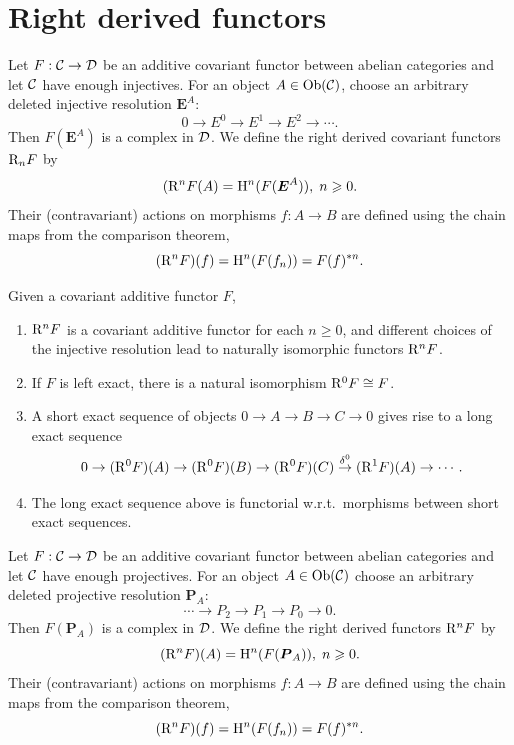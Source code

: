 \section{Right derived functors}

\begin{defn}
    Let $F:\mathcal{C}\to \mathcal{D}$ be an additive covariant functor between abelian categories and let $\mathcal{C}$ have enough injectives. For an object $A\in\operatorname{Ob}(\mathcal{C})$, choose an arbitrary deleted injective resolution $\bm{E}^A$:
    \[0\to E^0\to E^1\to E^2\to\cdots.\]
    Then $F(\bm{E}^A)$ is a complex in $\mathcal{D}$. We define the right derived covariant functors $\mathrm{R}_nF$ by
    \[(\mathrm{R}^nF(A)=\mathrm{H}^n(F(\boldsymbol{E}^A)),\; n\geqslant 0.\]
    Their (contravariant) actions on morphisms $f:A\to B$ are defined using the chain maps from the comparison theorem,
    \[(\mathrm{R}^nF)(f)=\mathrm{H}^n(F(f_n))=F(f)^{\ast n}.\]
\end{defn}

\begin{thm}
    Given a covariant additive functor $F$, 
    \begin{enumerate}
        \item $\mathrm{R}^nF$ is a covariant additive functor for each $n\geq 0$, and different choices of the injective resolution lead to naturally isomorphic functors $\mathrm{R}^nF$.
        \item If $F$ is left exact, there is a natural isomorphism $\mathrm{R}^0F\cong F$.
        \item A short exact sequence of objects $0\to A\to B\to C\to 0$ gives rise to a long exact sequence 
        \[0\to (\mathrm{R}^0F)(A)\to (\mathrm{R}^0F)(B)\to (\mathrm{R}^0F)(C)\overset{\delta^0}{\to} (\mathrm{R}^1F)(A)\to \cdots.\]
        \item The long exact sequence above is functorial w.r.t.\ morphisms between short exact sequences.
    \end{enumerate}
\end{thm}

\begin{defn}
    Let $F:\mathcal{C}\to \mathcal{D}$ be an additive covariant functor between abelian categories and let $\mathcal{C}$ have enough projectives. For an object $A\in \operatorname{Ob}(\mathcal{C})$ choose an arbitrary deleted projective resolution $\bm{P}_A$:
    \[\cdots \to P_2\to P_1\to P_0 \to 0.\]
    Then $F(\bm{P}_A)$ is a complex in $\mathcal{D}$. We define the right derived functors $\mathrm{R}^nF$ by 
    \[(\mathrm{R}^n F) (A)=\mathrm{H}^n(F(\boldsymbol{P}_A)), \; n\geqslant 0.\]
    Their (contravariant) actions on morphisms $f:A\to B$ are defined using the chain maps from the comparison theorem, \[(\mathrm{R}^n F)(f)=\mathrm{H}^n(F(f_n))=F(f)^{\ast n}.\]
\end{defn}

